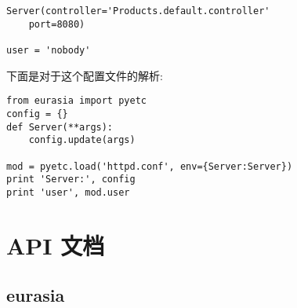 \documentclass{manual}
\begin{document}
\begin{verbatim}
Server(controller='Products.default.controller'
	port=8080)

user = 'nobody'
\end{verbatim}

下面是对于这个配置文件的解析:

\begin{verbatim}
from eurasia import pyetc
config = {}
def Server(**args):
	config.update(args)

mod = pyetc.load('httpd.conf', env={Server:Server})
print 'Server:', config
print 'user', mod.user
\end{verbatim}



\chapter{API 文档}

\section{eurasia}
\end{document}
